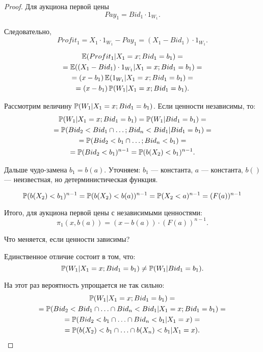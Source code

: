 \begin{proof}
Для аукциона первой цены
\begin{equation}
Pay_{1}=Bid_{1}\cdot 1_{W_{1}}.
\end{equation}

Следовательно,
\begin{equation}
Profit_{1}=X_{1}\cdot 1_{W_{1}}-Pay_{1}=(X_{1}-Bid_{1})\cdot 1_{W_{1}}.
\end{equation}


\begin{multline}
\E(Profit_{1}|X_{1}=x ; Bid_{1}=b_{1})=\\
=\E((X_{1}-Bid_{1})\cdot 1_{W_{1}}|X_{1}= x ; Bid_{1}=b_{1})=\\
= (x-b_{1})\E(1_{W_{1}}|X_{1}=x ; Bid_{1}=b_{1})=\\
=(x-b_{1})\P(W_{1}|X_{1}=x ; Bid_{1}=b_{1}).
\end{multline}

Рассмотрим величину $ \P(W_{1}|X_{1}=x ; Bid_{1}=b_{1}) $. Если ценности независимы, то:
\begin{multline}
\P(W_{1}|X_{1}=x ; Bid_{1}=b_{1})=\P(W_{1}|Bid_{1}=b_{1})= \\
=\P(Bid_{2}<Bid_{1}\cap \ldots ; Bid_{n}<Bid_{1}|Bid_{1}=b_{1})=\\
=\P(Bid_{2}<b_{1}\cap \ldots ; Bid_{n}<b_{1})=\\
=\P(Bid_{2}<b_{1})^{n-1}=\P(b(X_{2})<b_{1})^{n-1}.
\end{multline}

Дальше чудо-замена $ b_{1}=b(a) $. Уточняем: $ b_{1} $ — константа, $ a $ — константа, $ b() $ — неизвестная, но детерминистическая функция.

\begin{equation}
\P(b(X_{2})<b_{1})^{n-1}=\P(b(X_{2})<b(a))^{n-1}=\P(X_{2}<a)^{n-1}=(F(a))^{n-1}
\end{equation}

Итого, для аукциона первой цены с независимыми ценностями:
\begin{equation}
\pi_{1}(x,b(a))=(x-b(a))\cdot (F(a))^{n-1}.
\end{equation}

Что меняется, если ценности зависимы?

Единственное отличие состоит в том, что:
\begin{equation}
\P(W_{1}|X_{1}=x ; Bid_{1}=b_{1}) \neq \P(W_{1}|Bid_{1}=b_{1}).
\end{equation}

На этот раз вероятность упрощается не так сильно:
\begin{multline}
\P(W_{1}|X_{1}=x ; Bid_{1}=b_{1})=\\
=\P(Bid_{2}<Bid_{1}\cap \ldots \cap Bid_{n}<Bid_{1}|X_{1}=x ; Bid_{1}=b_{1})=\\
=\P(Bid_{2}<b_{1}\cap \ldots \cap Bid_{n}<b_{1}|X_{1}=x)=\\
=\P(b(X_{2})<b_{1}\cap \ldots \cap b(X_{n})<b_{1}|X_{1}=x).
\end{multline}


\end{proof}
